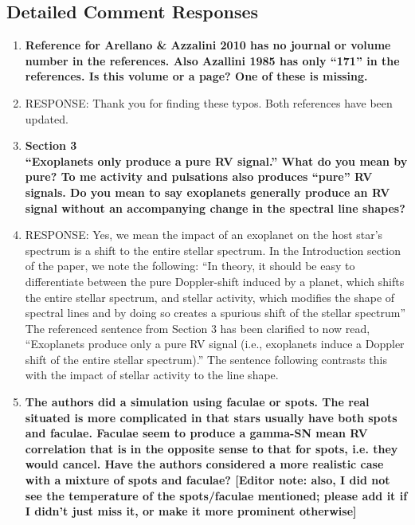 \documentclass[11pt]{article}   	%
\begin{document}
\bigskip


\subsection{Detailed Comment Responses}

\begin{enumerate}
\item {\bf Reference for Arellano \& Azzalini 2010 has no journal or volume number in the references. Also Azallini 1985 has only ``171'' in the references. Is this volume or a page? One of these is missing.}
%
\item[]  RESPONSE:  Thank you for finding these typos.  Both references have been updated.
\bigskip
%
%
\item {\bf Section 3 \\
``Exoplanets only produce a pure RV signal.'' What do you mean by pure? To me activity and pulsations also produces ``pure'' RV signals. Do you mean to say exoplanets generally produce an RV signal without an accompanying change in the spectral line shapes?}
%
\item[]  RESPONSE:  Yes, we mean the impact of an exoplanet on the host star's spectrum is a shift to the entire stellar spectrum.  In the Introduction section of the paper, we note the following:  ``In theory, it should be easy to differentiate between the pure Doppler-shift induced by a planet, which shifts the entire stellar spectrum, and stellar activity, which modifies the shape of spectral lines and by doing so creates a spurious shift of the stellar spectrum''  The referenced sentence from Section 3 has been clarified to now read, ``Exoplanets  produce only a pure RV signal (i.e., exoplanets induce a Doppler shift of the entire stellar spectrum).''  The sentence following contrasts this with the impact of stellar activity to the line shape.
\bigskip
%
%
\item {\bf The authors did a simulation using faculae or spots. The real situated is more complicated in that stars usually have both spots and faculae. Faculae seem to produce a gamma-SN mean RV correlation that is in the opposite sense to that for spots, i.e. they would cancel. Have the authors considered a more realistic case with a mixture of spots and faculae? [Editor note: also, I did not see the temperature of the spots/faculae mentioned; please add it if I didn't just miss it, or make it more prominent otherwise]}
%

\end{enumerate}
\end{document}
